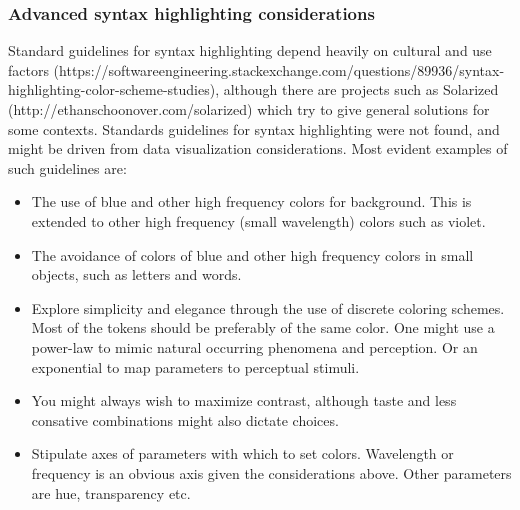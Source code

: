 \documentclass{article}
\begin{document}
\subsubsection{Advanced syntax highlighting considerations}
Standard guidelines for syntax highlighting
depend heavily on cultural and use factors
(https://softwareengineering.stackexchange.com/questions/89936/syntax-highlighting-color-scheme-studies),
although there are projects such as Solarized~\cite{solazired}
(http://ethanschoonover.com/solarized)
which try to give general solutions for some contexts.
Standards guidelines for syntax highlighting were not found,
and might be driven from data visualization considerations.
Most evident examples of such guidelines are:
\begin{itemize}
  \item The use of blue and other high frequency colors for
  background.
  This is extended to other high frequency (small wavelength)
  colors such as violet.
  \item The avoidance of colors of blue and other high frequency
  colors in small objects, such as letters and words.
  \item Explore simplicity and elegance through the use of discrete
  coloring schemes. Most of the tokens should be preferably of
  the same color.
  One might use a power-law to mimic natural occurring phenomena
  and perception. Or an exponential to map parameters to perceptual
  stimuli.
  \item You might always wish to maximize contrast,
  although taste and less consative combinations might
  also dictate choices.
  \item Stipulate axes of parameters with which to set colors.
  Wavelength or frequency is an obvious axis given the considerations
  above.
  Other parameters are hue, transparency etc.


\end{itemize}
\end{document}
